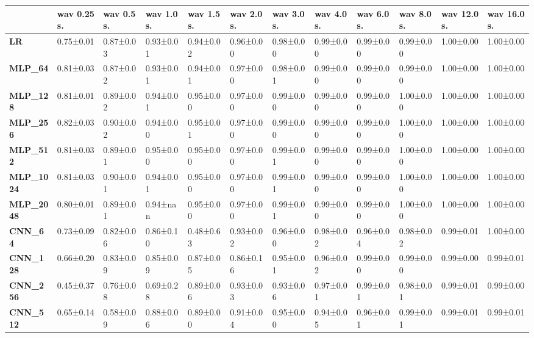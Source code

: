 \begin{tabular}{llllllllllll}
\toprule
{} & wav 0.25 s. & wav 0.5 s. & wav 1.0 s. & wav 1.5 s. & wav 2.0 s. & wav 3.0 s. & wav 4.0 s. & wav 6.0 s. & wav 8.0 s. & wav 12.0 s. & wav 16.0 s. \\
\midrule
\textbf{LR            } &   0.75±0.01 &  0.87±0.03 &  0.93±0.01 &  0.94±0.02 &  0.96±0.00 &  0.98±0.00 &  0.99±0.00 &  0.99±0.00 &  0.99±0.00 &   1.00±0.00 &   1.00±0.00 \\
\textbf{MLP\_64        } &   0.81±0.03 &  0.87±0.02 &  0.93±0.01 &  0.94±0.01 &  0.97±0.00 &  0.98±0.01 &  0.99±0.00 &  0.99±0.00 &  0.99±0.00 &   1.00±0.00 &   1.00±0.00 \\
\textbf{MLP\_128       } &   0.81±0.01 &  0.89±0.02 &  0.94±0.01 &  0.95±0.00 &  0.97±0.00 &  0.99±0.00 &  0.99±0.00 &  0.99±0.00 &  1.00±0.00 &   1.00±0.00 &   1.00±0.00 \\
\textbf{MLP\_256       } &   0.82±0.03 &  0.90±0.02 &  0.94±0.00 &  0.95±0.01 &  0.97±0.00 &  0.99±0.00 &  0.99±0.00 &  0.99±0.00 &  1.00±0.00 &   1.00±0.00 &   1.00±0.00 \\
\textbf{MLP\_512       } &   0.81±0.03 &  0.89±0.01 &  0.95±0.00 &  0.95±0.00 &  0.97±0.00 &  0.99±0.01 &  0.99±0.00 &  0.99±0.00 &  1.00±0.00 &   1.00±0.00 &   1.00±0.00 \\
\textbf{MLP\_1024      } &   0.81±0.03 &  0.90±0.01 &  0.94±0.01 &  0.95±0.00 &  0.97±0.00 &  0.99±0.01 &  0.99±0.00 &  0.99±0.00 &  1.00±0.00 &   1.00±0.00 &   1.00±0.00 \\
\textbf{MLP\_2048      } &   0.80±0.01 &  0.89±0.01 &   0.94±nan &  0.95±0.00 &  0.97±0.00 &  0.99±0.01 &  0.99±0.00 &  0.99±0.00 &  1.00±0.00 &   1.00±0.00 &   1.00±0.00 \\
\textbf{CNN\_64        } &   0.73±0.09 &  0.82±0.06 &  0.86±0.10 &  0.48±0.63 &  0.93±0.02 &  0.96±0.00 &  0.98±0.02 &  0.96±0.04 &  0.98±0.02 &   0.99±0.01 &   1.00±0.00 \\
\textbf{CNN\_128       } &   0.66±0.20 &  0.83±0.09 &  0.85±0.09 &  0.87±0.05 &  0.86±0.16 &  0.95±0.01 &  0.96±0.02 &  0.99±0.00 &  0.99±0.00 &   0.99±0.00 &   0.99±0.01 \\
\textbf{CNN\_256       } &   0.45±0.37 &  0.76±0.08 &  0.69±0.28 &  0.89±0.06 &  0.93±0.03 &  0.93±0.06 &  0.97±0.01 &  0.99±0.01 &  0.98±0.01 &   0.99±0.01 &   0.99±0.00 \\
\textbf{CNN\_512       } &   0.65±0.14 &  0.58±0.09 &  0.88±0.06 &  0.89±0.00 &  0.91±0.04 &  0.95±0.00 &  0.94±0.05 &  0.96±0.01 &  0.99±0.01 &   0.99±0.01 &   0.99±0.01 \\

\end{tabular}
